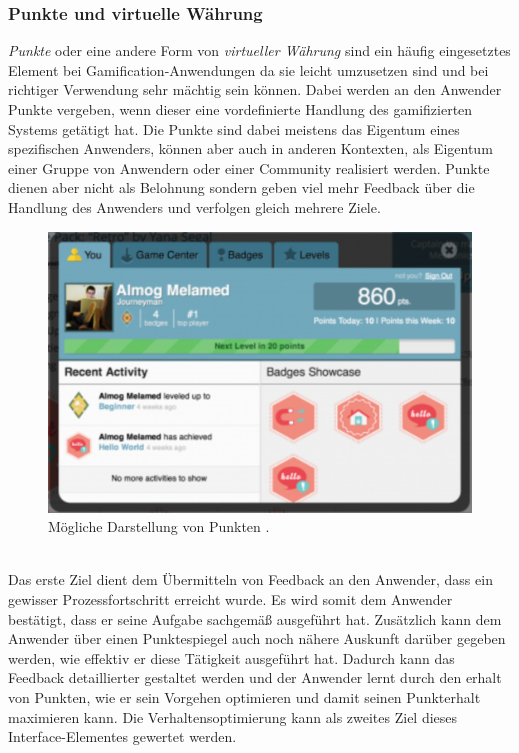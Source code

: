 \documentclass[a4paper,12pt,twoside]{scrartcl}
\begin{document}
\subsubsection{Punkte und virtuelle Währung}
\textit{Punkte} oder eine andere Form von \textit{virtueller Währung} sind ein häufig eingesetztes Element bei Gamification-Anwendungen da sie leicht umzusetzen sind und bei richtiger Verwendung sehr mächtig sein können. Dabei werden an den Anwender Punkte vergeben, wenn dieser eine vordefinierte Handlung des gamifizierten Systems getätigt hat. Die Punkte sind dabei meistens das Eigentum eines spezifischen Anwenders, können aber auch in anderen Kontexten, als Eigentum einer Gruppe von Anwendern oder einer Community realisiert werden. Punkte dienen aber nicht als Belohnung sondern geben viel mehr Feedback über die Handlung des Anwenders und verfolgen gleich mehrere Ziele.
\\
\begin{figure}[h!]
\begin{center}
\includegraphics[scale = 0.7]{Bilder/Points.eps}
\caption{Mögliche Darstellung von Punkten \cite{Points}.}
\label{PointsBild}
\end{center}
\end{figure} 
\\
Das erste Ziel dient dem Übermitteln von Feedback an den Anwender, dass ein gewisser Prozessfortschritt erreicht wurde. Es wird somit dem Anwender bestätigt, dass er seine Aufgabe sachgemäß ausgeführt hat. Zusätzlich kann dem Anwender über einen Punktespiegel auch noch nähere Auskunft darüber gegeben werden, wie effektiv er diese Tätigkeit ausgeführt hat. Dadurch kann das Feedback detaillierter gestaltet werden und der Anwender lernt durch den erhalt von Punkten, wie er sein Vorgehen optimieren und damit seinen Punkterhalt maximieren kann. Die Verhaltensoptimierung kann als zweites Ziel dieses Interface-Elementes gewertet werden.
\end{document}
